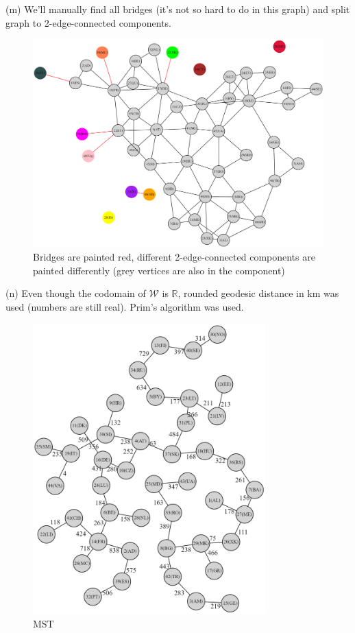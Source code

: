 \documentclass{article}
\begin{document}
	\newpage
	(m) We'll manually find all bridges (it's not so hard to do in this graph) and split graph to 2-edge-connected components.
	\begin{figure}[h]
		\centering
		\includegraphics[width=1\textwidth]{2edge.png}
		\caption{Bridges are painted red, different 2-edge-connected components are painted differently (grey vertices are also in the component)}
	\end{figure}\newpage
	(n) Even though the codomain of {\footnotesize$\mathcal{W}$} is $\mathds{R}$, rounded geodesic distance in km was used (numbers are still real). Prim's algorithm was used.
	\begin{figure}[h]
		\centering
		\includegraphics[width=0.8\textwidth]{tree.png}
		\caption{MST}
	\end{figure}\newpage
\end{document}
